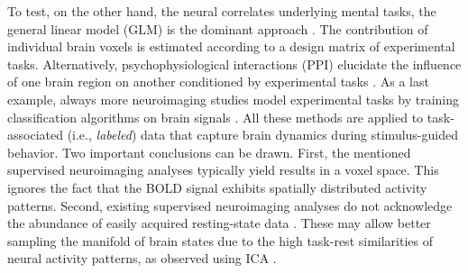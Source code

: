 \documentclass{article} %
\begin{document}
To test, on the other hand,
the neural correlates underlying mental tasks,
the general linear model (GLM) is the dominant approach \cite{friston94}.
The contribution of
individual brain voxels is estimated
according to a design matrix of experimental tasks.
Alternatively, psychophysiological interactions (PPI)
elucidate the influence of one brain region on another conditioned
by experimental tasks \cite{friston97}.
As a last example, always more neuroimaging studies model
experimental tasks by training classification algorithms on brain signals
\cite{poldrack09decoding}.
All these methods are applied to task-associated (i.e., \textit{labeled})
data that capture brain dynamics
during stimulus-guided behavior.
Two important conclusions can be drawn.
First, the mentioned supervised neuroimaging analyses typically yield
results in a voxel space.
This ignores the fact that the BOLD
signal exhibits spatially distributed activity patterns.
%
Second, existing supervised neuroimaging analyses
do not acknowledge the abundance
of easily acquired resting-state data \cite{biswaldiscovery}.
These may allow better sampling the manifold of brain states
due to the high task-rest similarities of neural activity patterns,
as observed using ICA \cite{smith2009}.
\end{document}

